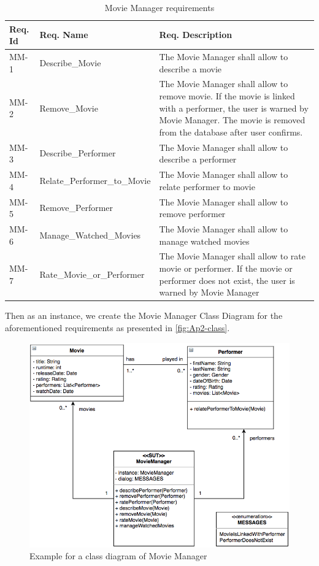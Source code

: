 \begin{table} [H] 
  \begin{center}
  \begin{small}
\caption{Movie Manager requirements}
\label{tab:MMreq}
\begin{tabular}{  m{1.3cm} | m{3.8cm} | m{8cm}  }
\hline
\textbf{Req. Id}& \textbf{Req. Name}&\textbf{Req. Description}   \\
\hline
MM-1& Describe\_Movie&The Movie Manager shall allow to describe a movie\\
\hline
MM-2&Remove\_Movie&The Movie Manager shall allow to remove movie. If the movie is linked with a performer, the user is warned by Movie Manager. The movie is removed from the database after user confirms.\\
\hline
MM-3&Describe\_Performer& The Movie Manager shall allow to describe a performer\\
\hline
MM-4&Relate\_Performer\_to\_Movie&The Movie Manager shall allow to relate performer to movie \\
\hline
MM-5&Remove\_Performer& The Movie Manager shall allow to remove performer\\
\hline
MM-6&Manage\_Watched\_Movies& The Movie Manager shall allow to manage watched movies\\
\hline
MM-7& Rate\_Movie\_or\_Performer& The Movie Manager shall allow to rate movie or performer. If the movie or performer does not exist, the user is warned by Movie Manager\\
\hline
\end{tabular}
\end{small}
 \end{center}
\end{table}

Then as an instance, we create the Movie Manager Class Diagram for the aforementioned requirements as presented in \autoref{fig:Ap2-class}.

\begin{figure} [H] 
\centering
\includegraphics[scale=0.45]{../images/Ap2-class} 
\caption{Example for a class diagram of Movie Manager}
\label{fig:Ap2-class}
\end{figure}

